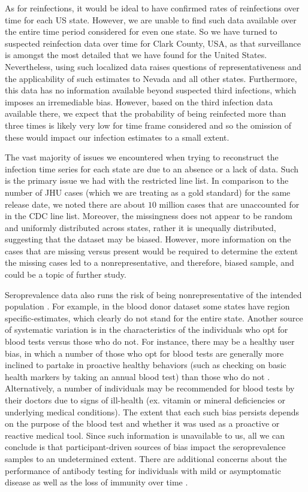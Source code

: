 \documentclass{article}
\begin{document}
As for reinfections, it would be ideal to have confirmed rates of reinfections
over time for each US state. However, we are unable to find such data available
over the entire time period considered for even one state. So we have turned to
suspected reinfection data over time for Clark County, USA, as that surveillance
is amongst the most detailed that we have found for the United States.
Nevertheless, using such localized data raises questions of representativeness
and the applicability of such estimates to Nevada and all other states.
Furthermore, this data has no information available beyond suspected third
infections, which imposes an irremediable bias. However, based on the third
infection data available there, we expect that the probability of being
reinfected more than three times is likely very low for time frame considered
and so the omission of these would impact our infection estimates to a small
extent. 

The vast majority of issues we encountered when trying to reconstruct the
infection time series for each state are due to an absence or a lack of data.
Such is the primary issue we had with the restricted line list. In comparison to
the number of JHU cases (which we are treating as a gold standard) for the same
release date, we noted there are about $10$ million cases that are unaccounted
for in the CDC line list. Moreover, the missingness does not appear to be random
and uniformly distributed across states, rather it is unequally distributed,
suggesting that the dataset may be biased. However, more information on the
cases that are missing versus present would be required to determine the extent
the missing cases led to a nonrepresentative, and therefore, biased sample, and
could be a topic of further study.

Seroprevalence data also runs the risk of being nonrepresentative of the
intended population \citep{bajema2021estimated}. For example, in the blood donor
dataset some states have region specific-estimates, which clearly do not stand
for the entire state. Another source of systematic variation is in the
characteristics of the individuals who opt for blood tests versus those who do
not. For instance, there may be a healthy user bias, in which a number of those
who opt for blood tests are generally more inclined to partake in proactive
healthy behaviors (such as checking on basic health markers by taking an annual
blood test) than those who do not \citep{parsley2018blood}. Alternatively, a
number of individuals may be recommended for blood tests by their doctors due to
signs of ill-health (ex. vitamin or mineral deficiencies or underlying medical
conditions). The extent that each such bias persists depends on the purpose of
the blood test and whether it was used as a proactive or reactive medical tool.
Since such information is unavailable to us, all we can conclude is that
participant-driven sources of bias impact the seroprevalence samples to an
undetermined extent. There are additional concerns about the performance of
antibody testing for individuals with mild or asymptomatic disease as well as
the loss of immunity over time \citep{kaku2021performance, seow2020longitudinal,
ibarrondo2020rapid}.
\end{document}
